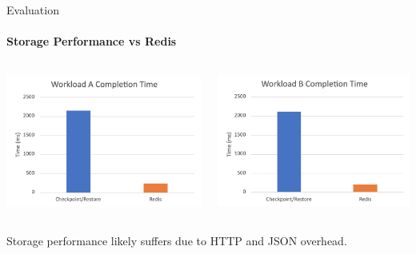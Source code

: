 \documentclass{beamer}
\begin{document}
\begin{frame}{Evaluation}
  \framesubtitle{Storage Performance vs Redis}

  \begin{columns}
    \includegraphics[scale=0.4]{../paper/redis-workload-A}

    \includegraphics[scale=0.2]{../paper/redis-workload-B}
  \end{columns}

  \hspace{1cm}

  \centering
  Storage performance likely suffers due to HTTP and JSON overhead.
\end{frame}
\end{document}
